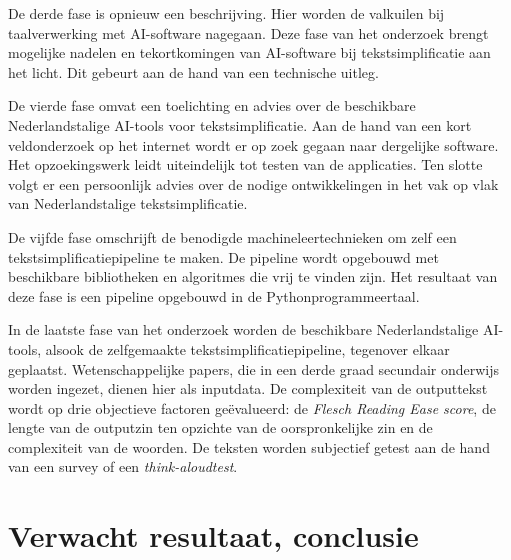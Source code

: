 De derde fase is opnieuw een beschrijving. Hier worden de valkuilen bij taalverwerking met AI-software nagegaan. Deze fase van het onderzoek brengt mogelijke nadelen en tekortkomingen van AI-software bij tekstsimplificatie aan het licht. Dit gebeurt aan de hand van een technische uitleg.

De vierde fase omvat een toelichting en advies over de beschikbare Nederlandstalige AI-tools voor tekstsimplificatie. Aan de hand van een kort veldonderzoek op het internet wordt er op zoek gegaan naar dergelijke software. Het opzoekingswerk leidt uiteindelijk tot testen van de applicaties. Ten slotte volgt er een persoonlijk advies over de nodige ontwikkelingen in het vak op vlak van Nederlandstalige tekstsimplificatie.

De vijfde fase omschrijft de benodigde machineleertechnieken om zelf een tekstsimplificatiepipeline te maken. De pipeline wordt opgebouwd met beschikbare bibliotheken en algoritmes die vrij te vinden zijn. Het resultaat van deze fase is een pipeline opgebouwd in de Pythonprogrammeertaal. 


In de laatste fase van het onderzoek worden de beschikbare Nederlandstalige AI-tools, alsook de zelfgemaakte tekstsimplificatiepipeline, tegenover elkaar geplaatst. Wetenschappelijke papers, die in een derde graad secundair onderwijs worden ingezet, dienen hier als inputdata. De complexiteit van de outputtekst wordt op drie objectieve factoren geëvalueerd: de \textit{Flesch Reading Ease score}, de lengte van de outputzin ten opzichte van de oorspronkelijke zin en de complexiteit van de woorden. De teksten worden subjectief getest aan de hand van een survey of een \textit{think-aloudtest}.



\section{Verwacht resultaat, conclusie}
\label{sec:verwachte_resultaten}

